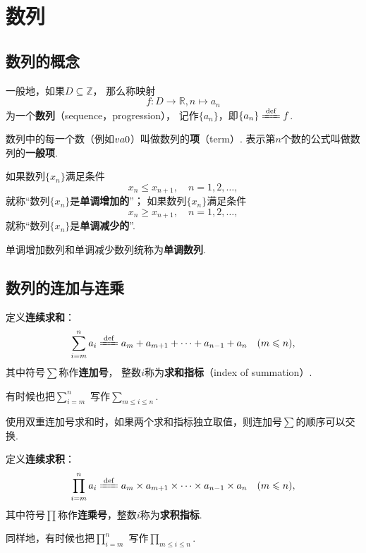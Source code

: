 \chapter{数列}
\section{数列的概念}
\begin{definition}\label{definition.数列.数列的定义}
一般地，如果\(D \subseteq \mathbb{Z}\)，%
那么称映射\[
    f\colon D\to\mathbb{R}, n \mapsto a_n
\]为一个\textbf{数列}（sequence，progression），
记作\(\{a_n\}\)，即\(\{a_n\} \defeq f\).

数列中的每一个数（例如\(v{a}{0}\)）叫做数列的\textbf{项}（term）.
表示第\(n\)个数的公式叫做数列的\textbf{一般项}.
\end{definition}

\begin{definition}
如果数列\(\{x_n\}\)满足条件\[
x_n \leqslant x_{n+1}, \quad n=1,2,\dotsc,
\]就称“数列\(\{x_n\}\)是\textbf{单调增加的}”；
如果数列\(\{x_n\}\)满足条件\[
x_n \geqslant x_{n+1}, \quad n=1,2,\dotsc,
\]就称“数列\(\{x_n\}\)是\textbf{单调减少的}”.

单调增加数列和单调减少数列统称为\textbf{单调数列}.
\end{definition}

\section{数列的连加与连乘}
\begin{definition}[连加]
定义\textbf{连续求和}：\[
\sum\limits_{i=m}^n a_i
\defeq
a_m + a_{m+1} + \dotsb + a_{n-1} + a_n
\quad(m \leqslant n),
\]其中符号\(\sum\)称作\textbf{连加号}，%
整数\(i\)称为\textbf{求和指标}（index of summation）.
\end{definition}

有时候也把\(\sum\limits_{i=m}^n\)%
写作\(\sum\limits_{m \leqslant i \leqslant n}\).

使用双重连加号求和时，如果两个求和指标独立取值，则连加号\(\sum\)的顺序可以交换.

\begin{definition}[连乘]
定义\textbf{连续求积}：\[
\prod\limits_{i=m}^n a_i
\defeq
a_m \times a_{m+1} \times \dotsb \times a_{n-1} \times a_n
\quad(m \leqslant n),
\]其中符号\(\prod\)称作\textbf{连乘号}，整数\(i\)称为\textbf{求积指标}.
\end{definition}

同样地，有时候也把\(\prod\limits_{i=m}^n\)%
写作\(\prod\limits_{m \leqslant i \leqslant n}\).

